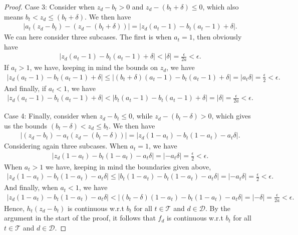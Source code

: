 \begin{proof}
    Case 3: Consider when \(z_d - b_t > 0\) and \(z_d - (b_t + \delta) \leq 0\), which also means \(b_t < z_d \leq (b_t + \delta)\).
    We then have
    \begin{align*}
    \lvert a_t(z_d - b_t) - (z_d - (b_t + \delta))\rvert = \lvert z_d(a_t - 1) - b_t(a_t - 1) + \delta\rvert.
    \end{align*}
    We can here consider three subcases. The first is when \(a_t = 1\), then obviously have 
    \begin{align*}
        \lvert z_d(a_t - 1) - b_t(a_t - 1) + \delta\rvert < \lvert \delta\rvert = \frac{\epsilon}{2a} < \epsilon.
    \end{align*}
    If \(a_t > 1\), we have, keeping in mind the bounds on \(z_d\), we have
    \begin{align*}
        \lvert z_d(a_t - 1) - b_t(a_t - 1) + \delta\rvert \leq \lvert (b_t+\delta) (a_t - 1) - b_t(a_t-1) + \delta \rvert = \lvert a_t \delta \rvert  = \frac{\epsilon}{2} < \epsilon.
    \end{align*}
    And finally, if \(a_t < 1\), we have
    \begin{align*}
        \lvert z_d(a_t - 1) - b_t(a_t - 1) + \delta\rvert < \lvert b_t (a_t - 1) - b_t(a_t-1) + \delta \rvert  =\lvert \delta\rvert = \frac{\epsilon}{2a} < \epsilon.
    \end{align*}

    Case 4: Finally, consider when \(z_d - b_t \leq 0\), while \(z_d - (b_t - \delta) > 0\), which gives us the bounds \((b_t-\delta) < z_d \leq b_t\).
    We then have
    \begin{align*}
        \lvert (z_d - b_t) - a_t(z_d - (b_t - \delta))\rvert = \lvert z_d(1 - a_t) - b_t(1-a_t) - a_t \delta \rvert. 
    \end{align*}
    Considering again three subcases. When \(a_t = 1\), we have
    \begin{align*}
        \lvert z_d(1-a_t) - b_t(1-a_t) - a_t \delta \rvert = \lvert -a_t \delta \rvert = \frac{\epsilon}{2} < \epsilon.
    \end{align*}
    When \(a_t > 1\) we have, keeping in mind the boundaries given above,
    \begin{align*}
        \lvert z_d(1-a_t) - b_t(1-a_t) - a_t \delta \rvert \leq \lvert b_t(1-a_t) - b_t(1-a_t) - a_t \delta\rvert = \lvert -a_t \delta\rvert = \frac{\epsilon}{2} < \epsilon.
    \end{align*}
    And finally, when \(a_t < 1\), we have
    \begin{align*}
        \lvert z_d(1-a_t) - b_t(1-a_t) - a_t \delta \rvert < \lvert (b_t - \delta)(1-a_t) - b_t(1-a_t) - a_t \delta\rvert = \lvert -\delta\rvert = \frac{\epsilon}{2a} < \epsilon.
    \end{align*}
    Hence, \(h_t(z_d - b_t)\) is continuous w.r.t \(b_t\) for all \(t \in \mathcal{T}\) and \(d \in \mathcal{D}\). By the argument in the start of the proof, it follows that \(f_d\) is continuous w.r.t \(b_t\)
    for all \(t\in \mathcal{T}\) and \(d \in \mathcal{D}\).
 \end{proof}

